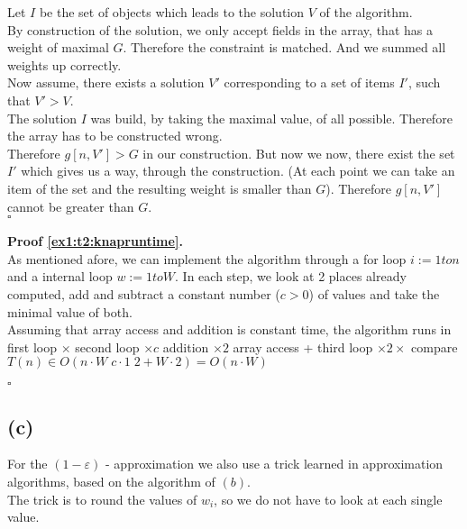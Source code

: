 Let $I$ be the set of objects which leads to the solution $V$ of the algorithm.\\
By construction of the solution, we only accept fields in the array, that has a weight of maximal $G$.
Therefore the constraint is matched. And we summed all weights up correctly.\\
Now assume, there exists a solution $V'$ corresponding to a set of items $I'$, such that $V' > V$.\\
The solution $I$ was build, by taking the maximal value, of all possible.
Therefore the array has to be constructed wrong.\\

Therefore $g[n,V'] > G$ in our construction. But now we now, there exist the set $I'$ which gives us a way, through
the construction. (At each point we can take an item of the set and the resulting weight is smaller than $G$).
Therefore $g[n,V']$ cannot be greater than $G$.\\

\mbox{} \hfill $\square$

\textbf{Proof \ref{ex1:t2:knapruntime}.}\\

As mentioned afore, we can implement the algorithm through a for loop $i := 1 to n$ and
a internal loop $w := 1 to W$. In each step, we look at 2 places already computed,
add and subtract a constant number ($c > 0$) of values and take the minimal value of both.\\
Assuming that array access and addition is constant time, the algorithm runs in\\
first loop $\times$ second loop $\times c$ addition $\times 2 $ array access + third loop $\times 2\times $ compare\\
$T(n) \in O(n \cdot W \; c \cdot 1 \; 2 + W \cdot 2) = O(n \cdot W)$

\mbox{} \hfill $\square$

\subsection*{(c)}

For the $(1 - \varepsilon)$ - approximation we also use a trick learned in approximation algorithms, based on the algorithm of $(b)$.\\

The trick is to round the values of $w_i$, so we do not have to look at each single value.\\

